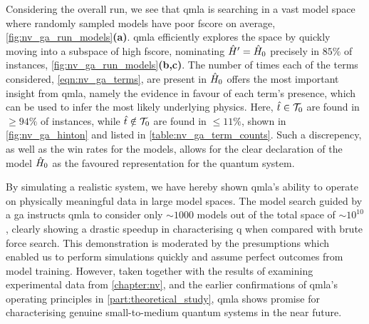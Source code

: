 Considering the overall \gls{run}, 
    we see that \gls{qmla} is searching in a vast \gls{model space} where randomly sampled models
    have poor \gls{fscore} on average, \cref{fig:nv_ga_run_models}\textbf{(a)}. 
\gls{qmla} efficiently explores the space by quickly moving into a 
    subspace of high \gls{fscore}, nominating $\hat{H}^{\prime} = \hat{H}_0$ precisely in $85\%$ of instances,
    \cref{fig:nv_ga_run_models}\textbf{(b,c)}.
The number of times each of the terms considered, \cref{eqn:nv_ga_terms}, 
    are present in $\hat{H}_0$ offers the most important insight from \gls{qmla}, 
    namely the evidence in favour of each term's presence, 
    which can be used to infer the most likely underlying physics. 
Here, $\hat{t} \in \mathcal{T}_0$ are found in $\geq 94\%$ of instances, 
    while $\hat{t} \notin \mathcal{T}_0$ are found in $\leq 11\%$, 
    shown in \cref{fig:nv_ga_hinton} and listed in \cref{table:nv_ga_term_counts}.
Such a discrepency, as well as the \glspl{win rate} for the models, 
    allows for the clear declaration of the model $\hat{H}_0$ as the favoured representation 
    for the quantum system. 
\par 

By simulating a realistic system, we have hereby shown \gls{qmla}'s ability to operate on physically meaningful data
    in large \glspl{model space}. 
The \gls{model search} guided by a \gls{ga} instructs \gls{qmla} to consider only $\sim1000$ models out of the 
    total space of $\sim10^{10}$, 
    clearly showing a drastic speedup in characterising \gls{q} when compared with brute force search.
This demonstration is moderated by the presumptions which enabled us to perform simulations quickly
    and assume perfect outcomes from model training. 
However, taken together with the results of examining experimental data from \cref{chapter:nv}, 
    and the earlier confirmations of \gls{qmla}'s operating principles in \cref{part:theoretical_study}, 
    \gls{qmla} shows promise for characterising genuine small-to-medium quantum systems in the near future. 

